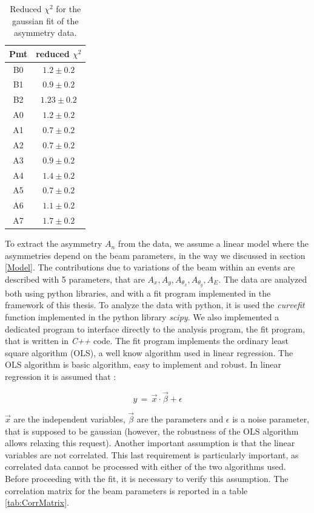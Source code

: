 \begin{table}[!h]
\centering
\begin{tabular}{c|c}
\hline 
Pmt & reduced $\chi^{2}$ \\ 
\hline
B0 & $1.2 \pm 0.2$ \\ 
B1 & $0.9 \pm 0.2$ \\ 
B2 & $1.23 \pm 0.2$ \\
A0 & $1.2 \pm 0.2$ \\ 
A1 & $0.7 \pm 0.2$ \\ 
A2 & $0.7 \pm 0.2$ \\ 
A3 & $0.9 \pm 0.2$ \\ 
A4 & $1.4 \pm 0.2$ \\ 
A5 & $0.7 \pm 0.2$ \\ 
A6 & $1.1 \pm 0.2$ \\ 
A7 & $1.7 \pm 0.2$ \\ 
\hline 
\end{tabular}
\caption{Reduced $\chi^{2}$ for the gaussian fit of the asymmetry data.} 
\label{tab:Chisq}
\end{table}

To extract the asymmetry $A_{n}$ from the data, we assume a linear model where the asymmetries depend on the beam parameters, in the way we discussed in section \ref{Model}. The contributions due to variations of the beam within an events are described with 5 parameters, that are  $A_{x},A_{y},A_{\theta_{x}},A_{\theta_{y}},A_{E}$.
The data are analyzed both using python libraries, and with a fit program implemented in the framework of this thesis. To analyze the data with python, it is used the \textit{curvefit} function implemented in the python library \textit{scipy}. We also implemented a dedicated program to interface directly to the analysis program, the fit program, that is written in \textit{C++} code. The fit program implements the ordinary least square algorithm (OLS), a well know algorithm used in linear regression. The OLS algorithm is basic algorithm, easy to implement and robust. 
In linear regression it is assumed that :

\begin{equation}
 y \, = \, \vec{x} \cdot \vec{\beta} + \epsilon
\end{equation}

$\vec{x}$ are the independent variables, $\vec{\beta}$ are the parameters and $\epsilon$ is a noise parameter, that is supposed to be gaussian (however, the robustness of the OLS algorithm allows relaxing this request). Another important assumption is that the linear variables are not correlated. 
This last requirement is particularly important, as correlated data cannot be processed with either of the two algorithms used. Before proceeding with the fit, it is necessary to verify this assumption. The correlation matrix for the beam parameters is reported in a table \ref{tab:CorrMatrix}.


